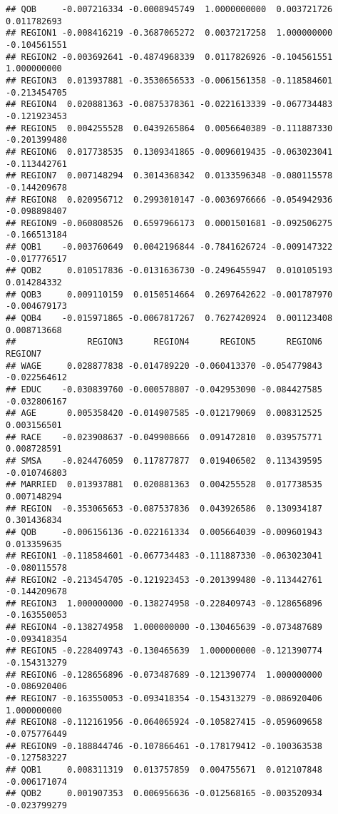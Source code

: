 \documentclass[
]{article}
\begin{document}
\begin{verbatim}
## QOB     -0.007216334 -0.0008945749  1.0000000000  0.003721726  0.011782693
## REGION1 -0.008416219 -0.3687065272  0.0037217258  1.000000000 -0.104561551
## REGION2 -0.003692641 -0.4874968339  0.0117826926 -0.104561551  1.000000000
## REGION3  0.013937881 -0.3530656533 -0.0061561358 -0.118584601 -0.213454705
## REGION4  0.020881363 -0.0875378361 -0.0221613339 -0.067734483 -0.121923453
## REGION5  0.004255528  0.0439265864  0.0056640389 -0.111887330 -0.201399480
## REGION6  0.017738535  0.1309341865 -0.0096019435 -0.063023041 -0.113442761
## REGION7  0.007148294  0.3014368342  0.0133596348 -0.080115578 -0.144209678
## REGION8  0.020956712  0.2993010147 -0.0036976666 -0.054942936 -0.098898407
## REGION9 -0.060808526  0.6597966173  0.0001501681 -0.092506275 -0.166513184
## QOB1    -0.003760649  0.0042196844 -0.7841626724 -0.009147322 -0.017776517
## QOB2     0.010517836 -0.0131636730 -0.2496455947  0.010105193  0.014284332
## QOB3     0.009110159  0.0150514664  0.2697642622 -0.001787970 -0.004679173
## QOB4    -0.015971865 -0.0067817267  0.7627420924  0.001123408  0.008713668
##              REGION3      REGION4      REGION5      REGION6      REGION7
## WAGE     0.028877838 -0.014789220 -0.060413370 -0.054779843 -0.022564612
## EDUC    -0.030839760 -0.000578807 -0.042953090 -0.084427585 -0.032806167
## AGE      0.005358420 -0.014907585 -0.012179069  0.008312525  0.003156501
## RACE    -0.023908637 -0.049908666  0.091472810  0.039575771  0.008728591
## SMSA    -0.024476059  0.117877877  0.019406502  0.113439595 -0.010746803
## MARRIED  0.013937881  0.020881363  0.004255528  0.017738535  0.007148294
## REGION  -0.353065653 -0.087537836  0.043926586  0.130934187  0.301436834
## QOB     -0.006156136 -0.022161334  0.005664039 -0.009601943  0.013359635
## REGION1 -0.118584601 -0.067734483 -0.111887330 -0.063023041 -0.080115578
## REGION2 -0.213454705 -0.121923453 -0.201399480 -0.113442761 -0.144209678
## REGION3  1.000000000 -0.138274958 -0.228409743 -0.128656896 -0.163550053
## REGION4 -0.138274958  1.000000000 -0.130465639 -0.073487689 -0.093418354
## REGION5 -0.228409743 -0.130465639  1.000000000 -0.121390774 -0.154313279
## REGION6 -0.128656896 -0.073487689 -0.121390774  1.000000000 -0.086920406
## REGION7 -0.163550053 -0.093418354 -0.154313279 -0.086920406  1.000000000
## REGION8 -0.112161956 -0.064065924 -0.105827415 -0.059609658 -0.075776449
## REGION9 -0.188844746 -0.107866461 -0.178179412 -0.100363538 -0.127583227
## QOB1     0.008311319  0.013757859  0.004755671  0.012107848 -0.006171074
## QOB2     0.001907353  0.006956636 -0.012568165 -0.003520934 -0.023799279

\end{verbatim}
\end{document}
